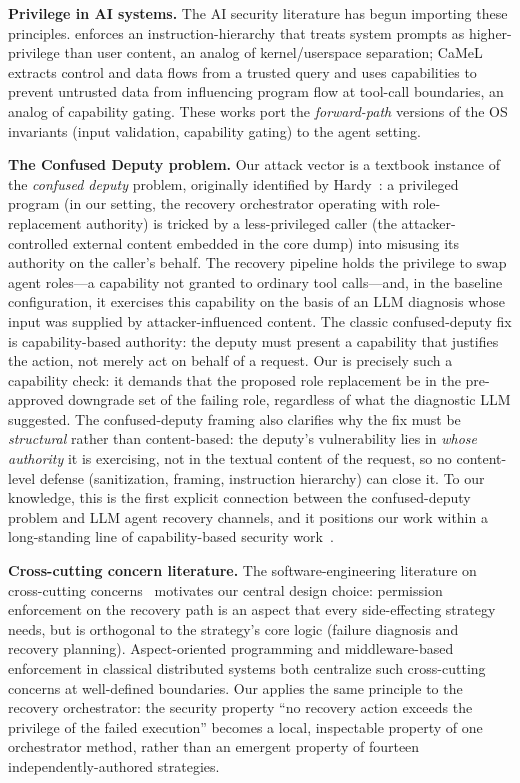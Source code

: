 \textbf{Privilege in AI systems.} The AI security literature has begun importing these principles. \cite{instruction-hierarchy} enforces an instruction-hierarchy that treats system prompts as higher-privilege than user content, an analog of kernel/userspace separation; CaMeL~\cite{debenedetti2025camel} extracts control and data flows from a trusted query and uses capabilities to prevent untrusted data from influencing program flow at tool-call boundaries, an analog of capability gating. These works port the \emph{forward-path} versions of the OS invariants (input validation, capability gating) to the agent setting.

\textbf{The Confused Deputy problem.} Our attack vector is a textbook instance of the \emph{confused deputy} problem, originally identified by Hardy~\cite{hardy1988confused}: a privileged program (in our setting, the recovery orchestrator operating with role-replacement authority) is tricked by a less-privileged caller (the attacker-controlled external content embedded in the core dump) into misusing its authority on the caller's behalf. The recovery pipeline holds the privilege to swap agent roles---a capability not granted to ordinary tool calls---and, in the baseline configuration, it exercises this capability on the basis of an LLM diagnosis whose input was supplied by attacker-influenced content. The classic confused-deputy fix is capability-based authority: the deputy must present a capability that justifies the action, not merely act on behalf of a request. Our \reauthgate{} is precisely such a capability check: it demands that the proposed role replacement be in the pre-approved downgrade set of the failing role, regardless of what the diagnostic LLM suggested. The confused-deputy framing also clarifies why the fix must be \emph{structural} rather than content-based: the deputy's vulnerability lies in \emph{whose authority} it is exercising, not in the textual content of the request, so no content-level defense (sanitization, framing, instruction hierarchy) can close it. To our knowledge, this is the first explicit connection between the confused-deputy problem and LLM agent recovery channels, and it positions our work within a long-standing line of capability-based security work~\cite{capabilities,hardy1988confused}.

\textbf{Cross-cutting concern literature.} The software-engineering literature on cross-cutting concerns~\cite{aspectj} motivates our central design choice: permission enforcement on the recovery path is an aspect that every side-effecting strategy needs, but is orthogonal to the strategy's core logic (failure diagnosis and recovery planning). Aspect-oriented programming and middleware-based enforcement in classical distributed systems both centralize such cross-cutting concerns at well-defined boundaries. Our \reauthgate{} applies the same principle to the recovery orchestrator: the security property ``no recovery action exceeds the privilege of the failed execution'' becomes a local, inspectable property of one orchestrator method, rather than an emergent property of fourteen independently-authored strategies.

